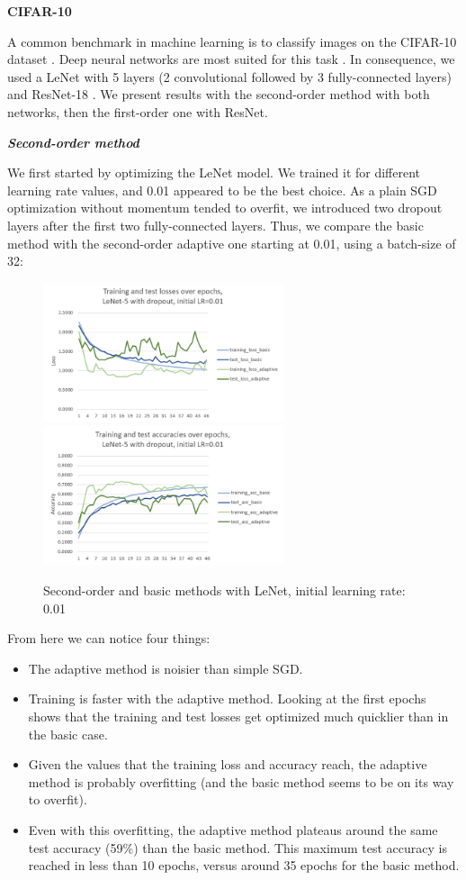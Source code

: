 \documentclass{article}
\begin{document}
  \textbf{CIFAR-10}
  
  A common benchmark in machine learning is to classify images on the CIFAR-10 dataset \cite{cifar}. Deep neural networks are most suited for this task \cite{krizhevsky2012imagenet}. In consequence, we used a LeNet with 5 layers (2 convolutional followed by 3 fully-connected layers) and ResNet-18 \cite{he2016deep}. We present results with the second-order method with both networks, then the first-order one with ResNet.
  
  \emph{\textbf{Second-order method}}
  
  We first started by optimizing the LeNet model. We trained it for different learning rate values, and 0.01 appeared to be the best choice. As a plain SGD optimization without momentum tended to overfit, we introduced two dropout layers after the first two fully-connected layers. Thus, we compare the basic method with the second-order adaptive one starting at 0.01, using a batch-size of 32:\\
  
  \begin{figure}[!h]
  	\includegraphics[width=200pt]{loss_lenet_d_0_01.png}
  	\includegraphics[width=200pt]{acc_lenet_d_0_01.png}
  	\caption{Second-order and basic methods with LeNet, initial learning rate: 0.01}
  \end{figure}

  From here we can notice four things:\\
  \begin{itemize}
  	\item The adaptive method is noisier than simple SGD.
  	\item Training is faster with the adaptive method. Looking at the first epochs shows that the training and test losses get optimized much quicklier than in the basic case.
  	\item Given the values that the training loss and accuracy reach, the adaptive method is probably overfitting (and the basic method seems to be on its way to overfit).
  	\item Even with this overfitting, the adaptive method plateaus around the same test accuracy (59\%) than the basic method. This maximum test accuracy is reached in less than 10 epochs, versus around 35 epochs for the basic method. 
  \end{itemize}
\end{document}
